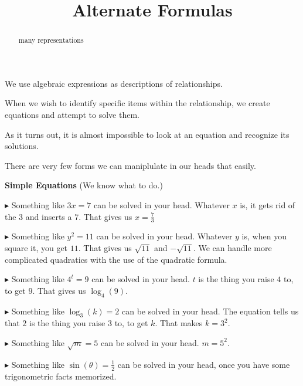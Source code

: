\documentclass{ximera}
\title{Alternate Formulas}
\begin{document}
\begin{abstract}
many representations
\end{abstract}
\maketitle





We use algebraic expressions as descriptions of relationships. 

When we wish to identify specific items within the relationship, we create equations and attempt to solve them. 

As it turns out, it is almost impossible to look at an equation and recognize its solutions.


There are very few forms we can maniplulate in our heads that easily.



\begin{summary} \textbf{\textcolor{red!70!yellow}{Simple Equations}}  (We know what to do.)

$\blacktriangleright$ Something like $3x = 7$ can be solved in your head.  Whatever $x$ is, it gets rid of the $3$ and inserts a $7$.  That gives us $x =\frac{7}{3}$





$\blacktriangleright$ Something like $y^2 = 11$ can be solved in your head.  Whatever $y$ is, when you square it, you get $11$.  That gives us $\sqrt{11}$ and $-\sqrt{11}$.  We can handle more complicated  quadratics with the use of the quadratic formula.




$\blacktriangleright$ Something like $4^t = 9$ can be solved in your head.  $t$ is the thing you raise $4$ to, to get $9$.  That gives us $\log_4(9)$.



$\blacktriangleright$ Something like $\log_3(k) = 2$ can be solved in your head.  The equation tells us that $2$ is the thing you raise $3$ to, to get $k$.  That makes $k = 3^2$.



$\blacktriangleright$ Something like $\sqrt{m} = 5$ can be solved in your head.  $m = 5^2$.


$\blacktriangleright$ Something like $\sin(\theta) = \frac{1}{2}$ can be solved in your head, once you have some trigonometric facts memorized.


\end{summary}
\end{document}
